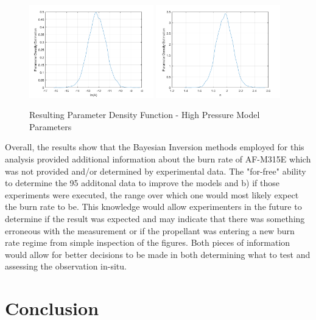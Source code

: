 \documentclass{article}
\begin{document}
\begin{figure}[htb!]
\centering
\includegraphics[width=0.48\textwidth]{PDF_lnA_HP.png}
\includegraphics[width=0.48\textwidth]{PDF_n_HP.png}
\caption{Resulting Parameter Density Function - High Pressure Model Parameters}
\label{HPpdf}
\end{figure}

Overall, the results show that the Bayesian Inversion methods employed for this analysis provided additional information
about the burn rate of AF-M315E which was not provided and/or determined by experimental data. The "for-free" ability to
determine the 95%
additonal data to improve the models and b) if those experiments were executed, the range over which one would most likely
expect the burn rate to be. This knowledge would allow experimenters in the future to determine if the result was expected
and may indicate that there was something erroneous with the measurement or if the propellant was entering a new burn rate
regime from simple inspection of the figures. Both pieces of information would allow for better decisions to be made in
both determining what to test and assessing the observation in-situ.

\section{Conclusion} \label{conclusion}
\end{document}
